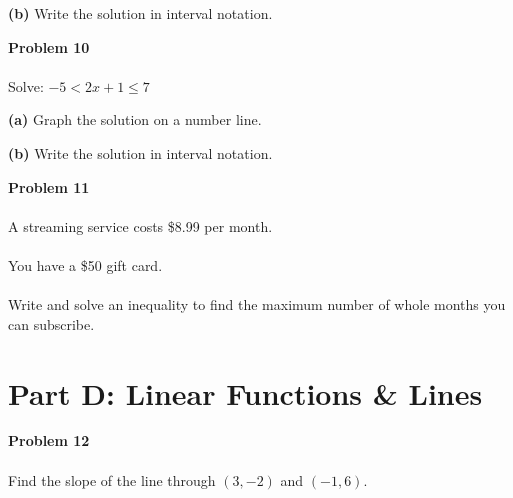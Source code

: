 \documentclass[12pt]{article}
\begin{document}
            \vspace{0.5cm}

            \textbf{(b)} Write the solution in interval notation.

            \vspace{2cm}

            \textbf{Problem 10}\\\\
            Solve: $-5 < 2x + 1 \leq 7$

            \vspace{3cm}

            \textbf{(a)} Graph the solution on a number line.

            \vspace{0.5cm}

            \begin{center}
            \end{center}

            \vspace{0.5cm}

            \textbf{(b)} Write the solution in interval notation.

            \newpage

            \textbf{Problem 11}\\\\
            A streaming service costs \$8.99 per month.\\\\
            You have a \$50 gift card.\\\\
            Write and solve an inequality to find the maximum number of whole months you can subscribe.

            \newpage

        \section*{Part D: Linear Functions \& Lines}

            \textbf{Problem 12}\\\\
            Find the slope of the line through $(3, -2)$ and $(-1, 6)$.
\end{document}
